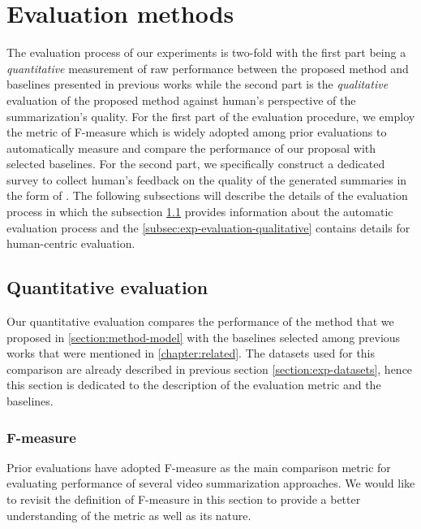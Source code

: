 \section{Evaluation methods}
\label{section:exp-evaluation}

The evaluation process of our experiments is two-fold with the first part being a \textit{quantitative} measurement of raw performance between the proposed method and baselines presented in previous works while the second part is the \textit{qualitative} evaluation of the proposed method against human's perspective of the summarization's quality. For the first part of the evaluation procedure, we employ the metric of F-measure which is widely adopted among prior evaluations to automatically measure and compare the performance of our proposal with selected baselines. For the second part, we specifically construct a dedicated survey to collect human's feedback on the quality of the generated summaries in the form of . The following subsections will describe the details of the evaluation process in which the subsection \ref{subsec:exp-evaluation-quantitative} provides information about the automatic evaluation process and the \ref{subsec:exp-evaluation-qualitative} contains details for human-centric evaluation.

\subsection{Quantitative evaluation}
\label{subsec:exp-evaluation-quantitative}
    Our quantitative evaluation compares the performance of the method that we proposed in \ref{section:method-model} with the baselines selected among previous works that were mentioned in \ref{chapter:related}. The datasets used for this comparison are already described in previous section \ref{section:exp-datasets}, hence this section is dedicated to the description of the evaluation metric and the baselines.

    \subsubsection{F-measure}
    \label{subsubsec:exp-evaluation-quantitative-fmeasure}
        Prior evaluations have adopted F-measure as the main comparison metric for evaluating performance of several video summarization approaches. We would like to revisit the definition of F-measure in this section to provide a better understanding of the metric as well as its nature.

